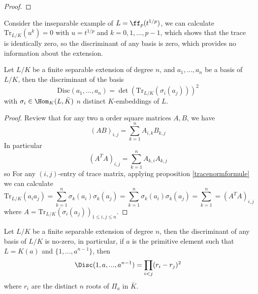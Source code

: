 \begin{proof}
  
\end{proof}

\begin{remark}
  Consider the inseparable example of \(L = \ff_p(t^{1/p})\), we can calculate  \(\mathrm{Tr}_{L/K}(u^k) = 0\) with \(u = t^{1/p}\) and \(k = 0,1,...,p-1\), which shows that the trace is identically zero, so the discriminant of any basis is zero, which provides no information about the extension.
\end{remark}

\begin{colorproposition}
  Let \(L/K\) be a finite separable extension of degree \(n\), and \(a_1,...,a_n\) be a basis of \(L/K\), then the discriminant of the basis 
  \[\mathrm{Disc}(a_1,...,a_n) = \det(\mathrm{Tr}_{L/K}(\sigma_i(a_j)))^2\]
  with \(\sigma_i \in \Hom_K(L,\bar{K})\) \(n\) distinct \(K\)-embeddings of \(L\). 
\end{colorproposition}

\begin{proof}
  Review that for any two n order square matrices \(A,B\), we have
  \[(AB)_{i,j} = \sum_{k=1}^n A_{i,k} B_{k,j}\]
  In particular
  \[(A^TA)_{i,j} = \sum_{k=1}^n A_{k,i}A_{k,j}\]
  so For any \((i,j)\)-entry of trace matrix, applying proposition \ref{tracenormformule} we can calculate
  \[\mathrm{Tr}_{L/K}(a_ia_j) = \sum_{k=1}^n \sigma_k(a_i)\sigma_k(a_j) = 
  \sum_{k=1}^n \sigma_k(a_i)\sigma_k(a_j) = \sum_{k=1}^n = (A^TA)_{i,j}\]
  where \(A = \mathrm{Tr}_{L/K}(\sigma_i(a_j))_{1 \leq i,j \leq n}\).
\end{proof}

\begin{colorcorollary}
  Let \(L/K\) be a finite separable extension of degree \(n\), then the discriminant of any basis of \(L/K\) is no-zero, in particular, if \(a\) is the primitive element such that \(L=K(a)\) and \(\{1,...,a^{n-1}\}\), then
  \[\Disc(1,a,...,a^{n-1}) = \prod_{i<j}(r_i-r_j)^2\]
  where \(r_i\) are the distinct \(n\) roots of \(\Pi_a\) in \(\bar{K}\).
\end{colorcorollary}

